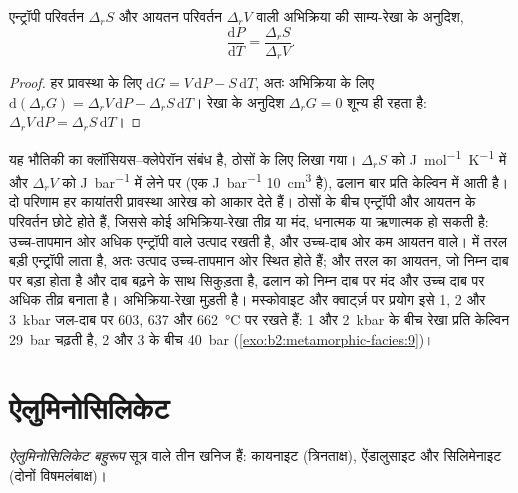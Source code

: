 \begin{proposition}[किसी अभिक्रिया की क्लेपेरॉन ढलान]\label{prop:b2:metamorphic-facies:clapeyron}
एन्ट्रॉपी परिवर्तन $\Delta_r S$ और आयतन
परिवर्तन $\Delta_r V$ वाली अभिक्रिया की साम्य-रेखा के अनुदिश,
\[
\frac{\mathrm dP}{\mathrm dT} = \frac{\Delta_r S}{\Delta_r V}.
\]
\end{proposition}

\begin{proof}
हर प्रावस्था के लिए $\mathrm dG = V\,\mathrm dP - S\,\mathrm dT$, अतः अभिक्रिया के लिए
$\mathrm d(\Delta_r G) = \Delta_r V\,\mathrm dP - \Delta_r S\,\mathrm dT$। रेखा के अनुदिश
$\Delta_r G = 0$ शून्य ही रहता है: $\Delta_r V\,\mathrm dP = \Delta_r S\,\mathrm dT$।
\end{proof}

यह भौतिकी का क्लॉसियस--क्लेपेरॉन संबंध है, ठोसों के लिए लिखा गया।
$\Delta_r S$ को \unit{J.mol^{-1}.K^{-1}} में और $\Delta_r V$ को \unit{J.bar^{-1}} में लेने पर (एक
\unit{J.bar^{-1}} \qty{10}{cm^3} है), ढलान बार प्रति केल्विन में आती है। दो
परिणाम हर कायांतरी प्रावस्था आरेख को आकार देते हैं। ठोसों के बीच एन्ट्रॉपी और आयतन के
परिवर्तन छोटे होते हैं, जिससे कोई अभिक्रिया-रेखा तीव्र या मंद, धनात्मक या
ऋणात्मक हो सकती है: उच्च-तापमान ओर अधिक एन्ट्रॉपी वाले उत्पाद रखती है, और
उच्च-दाब ओर कम आयतन वाले।  में तरल
बड़ी एन्ट्रॉपी लाता है, अतः उत्पाद उच्च-तापमान ओर स्थित होते हैं; और तरल का आयतन,
जो निम्न दाब पर बड़ा होता है और दाब बढ़ने के साथ सिकुड़ता है, ढलान को
निम्न दाब पर मंद और उच्च दाब पर अधिक तीव्र बनाता है। अभिक्रिया-रेखा मुड़ती है।
मस्कोवाइट और क्वार्ट्ज़ पर प्रयोग इसे 1,
2 और \qty{3}{kbar} जल-दाब पर 603, 637 और \qty{662}{\celsius} पर रखते हैं: 1 और \qty{2}{kbar} के बीच रेखा
प्रति केल्विन \qty{29}{bar} चढ़ती है, 2 और 3 के बीच \qty{40}{bar} (\cref{exo:b2:metamorphic-facies:9})।

\section{ऐलुमिनोसिलिकेट}\label{sec:b2:metamorphic-facies:al2sio5}

\begin{definition}[ऐलुमिनोसिलिकेट बहुरूप]\label{def:b2:metamorphic-facies:al2sio5}
\emph{ऐलुमिनोसिलिकेट बहुरूप} सूत्र  वाले तीन
खनिज हैं: कायनाइट (त्रिनताक्ष), ऐंडालुसाइट और सिलिमेनाइट (दोनों
विषमलंबाक्ष)।
\end{definition}

